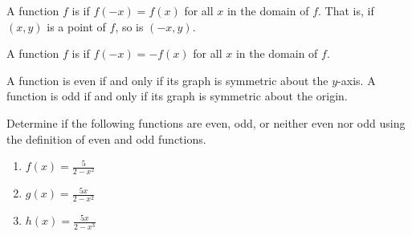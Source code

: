 \documentclass[nooutcomes]{ximera}
\begin{document}
\begin{definition}

A function $f$ is  if $f(-x) = f(x)$ for all $x$ in the domain of $f$. That is, if $(x,y)$ is a point of $f$, so is $(-x,y)$.

A function $f$ is  if $f(-x) = -f(x)$ for all $x$ in the domain of $f$.

\end{definition}

A function is even if and only if its graph is symmetric about the $y$-axis.  A function is odd if and only if its graph is symmetric about the origin.  

\begin{example}
Determine if the following functions are even, odd, or neither even nor odd using the definition of even and odd functions. 
\begin{enumerate}
\item $f(x) = \frac{5}{2 - x^2}$ 
\item $g(x) = \frac{5x}{2 - x^2}$ 
\item $h(x) = \frac{5x}{2 - x^3}$
\end{enumerate}
\end{example}
\end{document}
